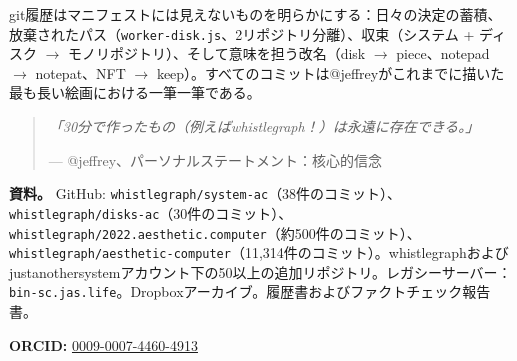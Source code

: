 \documentclass[10pt,letterpaper,twocolumn]{article}
\begin{document}
git履歴はマニフェストには見えないものを明らかにする：日々の決定の蓄積、放棄されたパス（\texttt{worker-disk.js}、2リポジトリ分離）、収束（システム + ディスク $\rightarrow$ モノリポジトリ）、そして意味を担う改名（disk $\rightarrow$ piece、notepad $\rightarrow$ notepat、NFT $\rightarrow$ keep）。すべてのコミットは@jeffreyがこれまでに描いた最も長い絵画における一筆一筆である。

\begin{quote}
\emph{「30分で作ったもの（例えばwhistlegraph！）は永遠に存在できる。」}

--- @jeffrey、パーソナルステートメント：核心的信念
\end{quote}

\vspace{0.5em}
\noindent\textbf{資料。} GitHub: \texttt{whistlegraph/system-ac}（38件のコミット）、\texttt{whistlegraph/disks-ac}（30件のコミット）、\texttt{whistlegraph/2022.aesthetic.computer}（約500件のコミット）、\texttt{whistlegraph/aesthetic-computer}（11,314件のコミット）。whistlegraphおよびjustanothersystemアカウント下の50以上の追加リポジトリ。レガシーサーバー：\texttt{bin-sc.jas.life}。Dropboxアーカイブ。履歴書およびファクトチェック報告書。

\vspace{0.5em}
\noindent\textbf{ORCID:} \href{https://orcid.org/0009-0007-4460-4913}{0009-0007-4460-4913}




\end{document}
